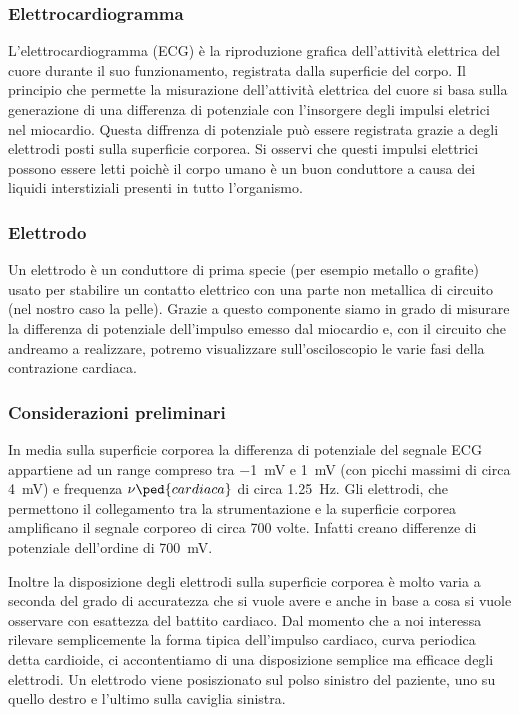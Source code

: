 \subsubsection*{Elettrocardiogramma}

L'elettrocardiogramma (ECG) è la riproduzione grafica dell'attività elettrica del cuore durante il suo funzionamento, registrata dalla superficie del corpo.
Il principio che permette la misurazione dell'attività elettrica del cuore si basa sulla generazione di una differenza di potenziale con l'insorgere degli impulsi eletrici nel miocardio. Questa diffrenza di potenziale può essere registrata grazie a degli elettrodi posti sulla superficie corporea. Si osservi che questi impulsi elettrici possono essere letti poichè il corpo umano è un buon conduttore a causa dei liquidi interstiziali presenti in tutto l'organismo.

\subsubsection*{Elettrodo}

Un elettrodo è un conduttore di prima specie (per esempio metallo o grafite) usato per stabilire un contatto elettrico con una parte non metallica di circuito (nel nostro caso la pelle). Grazie a questo componente siamo in grado di misurare la differenza di potenziale dell'impulso emesso dal miocardio e, con il circuito che andreamo a realizzare, potremo visualizzare sull'osciloscopio le varie fasi della contrazione cardiaca.

\subsubsection*{Considerazioni preliminari}

In media sulla superficie corporea la differenza di potenziale del segnale ECG appartiene ad un range compreso tra \SI{-1}{\milli\volt} e \SI{+1}{\milli\volt} (con picchi massimi di circa \SI{4}{\milli\volt}) e frequenza $\nu\ped{cardiaca}$ di circa \SI{1.25}{\hertz}. Gli elettrodi, che permettono il collegamento tra la strumentazione e la superficie corporea amplificano il segnale corporeo di circa 700 volte. Infatti creano differenze di potenziale dell'ordine di \SI{700}{\milli\volt}.

Inoltre la disposizione degli elettrodi sulla superficie corporea è molto varia a seconda del grado di accuratezza che si vuole avere e anche in base a cosa si vuole osservare con esattezza del battito cardiaco. Dal momento che a noi interessa rilevare semplicemente la forma tipica dell'impulso cardiaco, curva periodica detta cardioide, ci accontentiamo di una disposizione semplice ma efficace degli elettrodi. Un elettrodo viene posiszionato sul polso sinistro del paziente, uno su quello destro e l'ultimo sulla caviglia sinistra.

